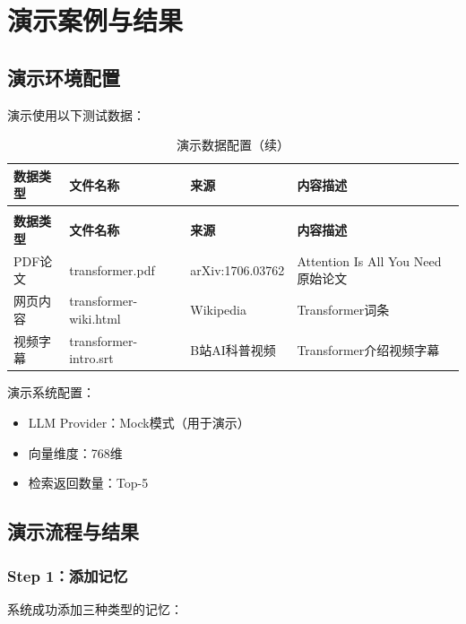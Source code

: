\documentclass[12pt,a4paper,oneside]{article}
\begin{document}
\newpage

\section{演示案例与结果}

\subsection{演示环境配置}

演示使用以下测试数据：

\begin{longtable}{p{2.5cm}p{3cm}p{3cm}p{3cm}}
    \caption{演示数据配置} \\
    \toprule
    \textbf{数据类型} & \textbf{文件名称} & \textbf{来源} & \textbf{内容描述} \\
    \midrule
    \endfirsthead
    \caption{演示数据配置（续）} \\
    \toprule
    \textbf{数据类型} & \textbf{文件名称} & \textbf{来源} & \textbf{内容描述} \\
    \midrule
    \endhead
    PDF论文 & transformer.pdf & arXiv:1706.03762 & Attention Is All You Need 原始论文 \\
    网页内容 & transformer-wiki.html & Wikipedia & Transformer词条 \\
    视频字幕 & transformer-intro.srt & B站AI科普视频 & Transformer介绍视频字幕 \\
    \bottomrule
\end{longtable}

演示系统配置：
\begin{itemize}
    \item LLM Provider：Mock模式（用于演示）
    \item 向量维度：768维
    \item 检索返回数量：Top-5
\end{itemize}

\subsection{演示流程与结果}

\subsubsection{Step 1：添加记忆}

系统成功添加三种类型的记忆：
\end{document}

